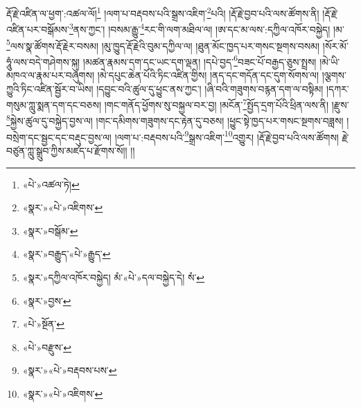 རྡོ་རྗེ་འཛིན་ལ་ཕྱག་:འཚལ་ལོ།\footnote{«པེ་»འཚལ་ཏེ།} །ལག་པ་བརྡབས་པའི་སྒྲས་འཇིག་\footnote{«སྣར་»«པེ་»འཇིགས་}པའི། །རྡོ་རྗེ་བྱབ་པའི་ལས་ཚོགས་ནི། །རྡོ་རྗེ་འཛིན་པར་བསྒོམས་\footnote{«སྣར་»བསྒོམ་}ནས་ཀྱང་། །བསམ་རྒྱུ་\footnote{«སྣར་»བརྒྱུད་«པེ་»རྒྱུད་}རང་གི་ལག་མཐིལ་ལ། །ཨ་དང་མ་ལས་:དཀྱིལ་འཁོར་བསྐྱེད། །མ་\footnote{«སྣར་»དཀྱིལ་འཁོར་བསྐྱེད། མཾ་«པེ་»དལ་བསྐྱེད་དེ། སཾ་}ལས་སྣ་ཚོགས་རྡོ་རྗེར་བསམ། །མུ་ཁྱུད་རྡོ་རྗེའི་བུམ་དཀྱིལ་ལ། །ཐུན་མོང་ཁྱད་པར་གསང་སྔགས་བསམ། །སོར་མོ་ཧཱུཾ་ལས་བདེ་གཤེགས་སྐུ། །མཚན་རྣམས་དག་དང་ཡང་དག་ལྡན། །དཔེ་བྱད་\footnote{«སྣར་»བྱས་}བཟང་པོ་བརྒྱད་ཅུས་སྤྲས། །མེ་ཡི་མཁའ་ལ་རྣམ་པར་བཞུགས། །མེ་དཔུང་ཆེན་པོའི་ཏིང་འཛིན་གྱིས། །ནད་དང་གདོན་དང་དུག་སོགས་ལ། །ལྕགས་ཀྱུའི་ཏིང་འཛིན་སྦྱོར་བ་ཡིས། །དབྱུང་བའི་ཚུལ་དུ་ཕྱུང་ནས་ཀྱང་། །ཞི་བའི་གཟུགས་བརྙན་དག་ལ་བསྟིམ། །དཀར་གསུམ་ཀླུ་སྨན་དག་དང་བཅས། །གང་གནོད་ཕྱོགས་སུ་བསྐྱལ་བར་བྱ། །མངོན་\footnote{«པེ་»སྔོན་}སྤྱོད་དྲག་པོའི་ཕྲིན་ལས་ནི། །རྫུས་\footnote{«པེ་»བརྫུས་}སྐྱེས་ཚུལ་དུ་བསྐྱེད་བྱས་ལ། །གང་དམིགས་གཟུགས་དང་རྟེན་དུ་བཅས། །ཕྱུང་སྟེ་ཁྱད་པར་གསང་སྔགས་བཟླས། །བསྲེག་དང་སྦྱང་དང་བརྡུང་བྱས་ལ། །ལག་པ་:བརྡབས་པའི་\footnote{«སྣར་»«པེ་»བརྡབས་པས་}སྒྲས་འཇིག་\footnote{«སྣར་»«པེ་»འཇིགས་}འགྱུར། །རྡོ་རྗེ་བྱབ་པའི་ལས་ཚོགས། རྗེ་བཙུན་ཀླུ་སྒྲུབ་ཀྱིས་མཛད་པ་རྫོགས་སོ།། །།